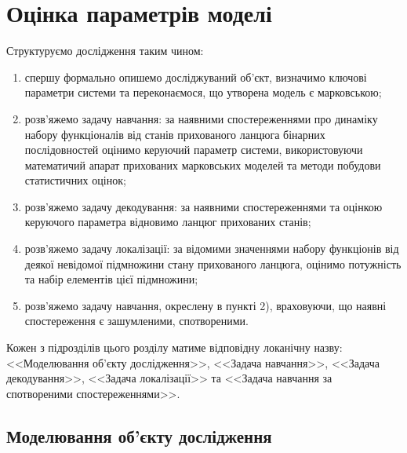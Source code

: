 \chapter{Оцінка параметрів моделі}
\label{chap: theory}

Структуруємо дослідження таким чином:

\begin{enumerate}
    \item спершу формально опишемо досліджуваний об'єкт, визначимо ключові параметри системи та переконаємося, що утворена модель є марковською;
    \item розв'яжемо задачу навчання: за наявними спостереженнями про динаміку набору функціоналів від станів прихованого ланцюга бінарних послідовностей оцінимо керуючий параметр системи, використовуючи математичий апарат прихованих марковських моделей та методи побудови статистичних оцінок;
    \item розв'яжемо задачу декодування: за наявними спостереженнями та оцінкою керуючого параметра відновимо ланцюг прихованих станів;
    \item розв'яжемо задачу локалізації: за відомими значеннями набору функціонів від деякої невідомої підмножини стану прихованого ланцюга, оцінимо потужність та набір елементів цієї підмножини;
    \item розв'яжемо задачу навчання, окреслену в пункті 2), враховуючи, що наявні спостереження є зашумленими, спотвореними.
\end{enumerate}

Кожен з підрозділів цього розділу матиме відповідну локанічну назву: <<Моделювання об'єкту дослідження>>, <<Задача навчання>>, <<Задача декодування>>, <<Задача локалізації>> та <<Задача навчання за спотвореними спостереженнями>>.

\section{Моделювання об'єкту дослідження}



